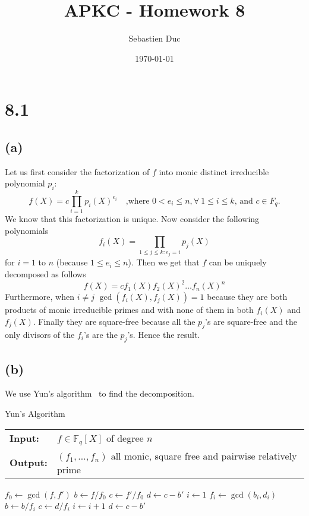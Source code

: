 \documentclass[12pt,a4paper]{article}
\title{APKC - Homework 8}
\author{Sebastien Duc}
\date{\today}
\begin{document}
\maketitle

\section*{8.1}

\subsection*{(a)}
Let us first consider the factorization of $f$ into monic distinct irreducible polynomial $p_i$:
\[
    f(X) = c \prod_{i=1}^{k}{p_i(X)^{e_i}} \quad\mbox{,where } 0<e_i\leq n, \forall\: 1 \leq i \leq k \mbox{, and $c\in F_q$}.
\]
We know that this factorization is unique.
Now consider the following polynomials
\[
    f_i(X) = \prod_{1 \leq j \leq k:e_j = i}p_j(X)
\]
for $i = 1$ to $n$ (because $1 \leq e_i \leq n$).
Then we get that $f$ can be uniquely decomposed as follows
\[
    f(X) = c f_1(X)f_2(X)^2\dots f_n(X)^n
\]
Furthermore, when $i\neq j$ $\gcd(f_i(X),f_j(X)) = 1$ because they are both products of monic irreducible primes and
with none of them in both $f_i(X)$ and $f_j(X)$. Finally they are square-free because all the $p_j$'s are square-free and 
the only divisors of the $f_i$'s are the $p_j$'s. Hence the result.


\subsection*{(b)}
We use Yun's algorithm~\cite{wiki} to find the decomposition.
\begin{algorithm}
    \caption{Yun's Algorithm}
    \begin{tabular}{l l}
        \textbf{Input:} & $ f \in \mathbb{F}_q[X] $ of degree $n$\\
        \textbf{Output:} & $ (f_1,\dots,f_n) $ all monic, square free and pairwise relatively prime\\
    \end{tabular}
    \begin{algorithmic}[1]
        \State $f_0 \gets \gcd(f,f')$
        \State $b \gets f/f_0$
        \State $c \gets f'/f_0$
        \State $d \gets c - b'$
        \State $i \gets 1$
        \Repeat
            \State $f_i \gets \gcd(b_i,d_i)$
            \State $b \gets b/f_i$
            \State $c \gets d/f_i$
            \State $i \gets i+1$
            \State $d \gets c - b'$
    \end{algorithmic}
\end{algorithm}
\end{document}

